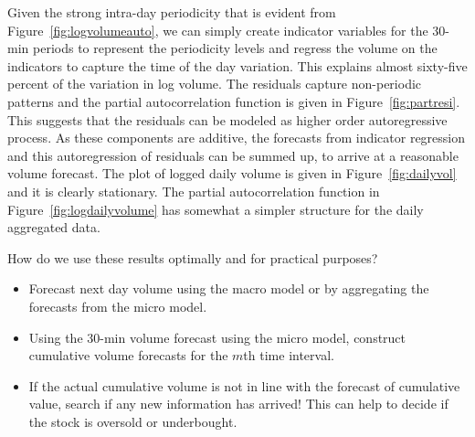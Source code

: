 Given the strong intra-day periodicity that is evident from Figure~\ref{fig:logvolumeauto}, we can simply create indicator variables for the 30-min periods to represent the periodicity levels and regress the volume on the indicators to capture the time of the day variation. This explains almost sixty-five percent of the variation in log volume. The residuals capture non-periodic patterns and the partial autocorrelation function is given in Figure~\ref{fig:partresi}. This suggests that the residuals can be modeled as higher order autoregressive process. As these components are additive, the forecasts from indicator regression and this autoregression of residuals can be summed up, to arrive at a reasonable volume forecast. The plot of logged daily volume is given in Figure~\ref{fig:dailyvol} and it is clearly stationary. The partial autocorrelation function in Figure~\ref{fig:logdailyvolume} has somewhat a simpler structure for the daily aggregated data. 


How do we use these results optimally and for practical purposes?
	\begin{itemize}
	\item Forecast next day volume using the macro model or by aggregating the forecasts from the micro model.
	\item Using the 30-min volume forecast using the micro model, construct cumulative volume forecasts for the $m$th time interval.
	\item If the actual cumulative volume is not in line with the forecast of cumulative value, search if any new information has arrived! This can help to decide if the stock is oversold or underbought. 
	\end{itemize}
	
